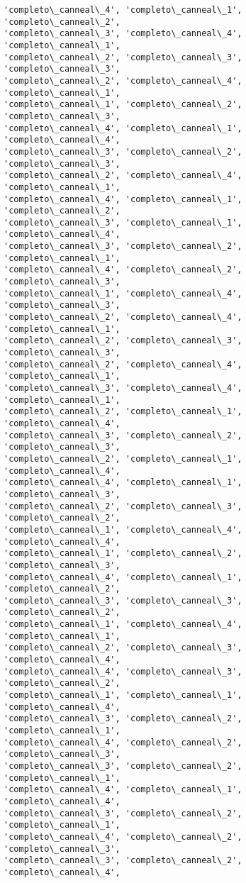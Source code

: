 \documentclass[11pt]{article}
\begin{document}
\begin{Verbatim}[commandchars=\\\{\}]
'completo\_canneal\_4', 'completo\_canneal\_1', 'completo\_canneal\_2',
'completo\_canneal\_3', 'completo\_canneal\_4', 'completo\_canneal\_1',
'completo\_canneal\_2', 'completo\_canneal\_3', 'completo\_canneal\_3',
'completo\_canneal\_2', 'completo\_canneal\_4', 'completo\_canneal\_1',
'completo\_canneal\_1', 'completo\_canneal\_2', 'completo\_canneal\_3',
'completo\_canneal\_4', 'completo\_canneal\_1', 'completo\_canneal\_4',
'completo\_canneal\_3', 'completo\_canneal\_2', 'completo\_canneal\_3',
'completo\_canneal\_2', 'completo\_canneal\_4', 'completo\_canneal\_1',
'completo\_canneal\_4', 'completo\_canneal\_1', 'completo\_canneal\_2',
'completo\_canneal\_3', 'completo\_canneal\_1', 'completo\_canneal\_4',
'completo\_canneal\_3', 'completo\_canneal\_2', 'completo\_canneal\_1',
'completo\_canneal\_4', 'completo\_canneal\_2', 'completo\_canneal\_3',
'completo\_canneal\_1', 'completo\_canneal\_4', 'completo\_canneal\_3',
'completo\_canneal\_2', 'completo\_canneal\_4', 'completo\_canneal\_1',
'completo\_canneal\_2', 'completo\_canneal\_3', 'completo\_canneal\_3',
'completo\_canneal\_2', 'completo\_canneal\_4', 'completo\_canneal\_1',
'completo\_canneal\_3', 'completo\_canneal\_4', 'completo\_canneal\_1',
'completo\_canneal\_2', 'completo\_canneal\_1', 'completo\_canneal\_4',
'completo\_canneal\_3', 'completo\_canneal\_2', 'completo\_canneal\_3',
'completo\_canneal\_2', 'completo\_canneal\_1', 'completo\_canneal\_4',
'completo\_canneal\_4', 'completo\_canneal\_1', 'completo\_canneal\_3',
'completo\_canneal\_2', 'completo\_canneal\_3', 'completo\_canneal\_2',
'completo\_canneal\_1', 'completo\_canneal\_4', 'completo\_canneal\_4',
'completo\_canneal\_1', 'completo\_canneal\_2', 'completo\_canneal\_3',
'completo\_canneal\_4', 'completo\_canneal\_1', 'completo\_canneal\_2',
'completo\_canneal\_3', 'completo\_canneal\_3', 'completo\_canneal\_2',
'completo\_canneal\_1', 'completo\_canneal\_4', 'completo\_canneal\_1',
'completo\_canneal\_2', 'completo\_canneal\_3', 'completo\_canneal\_4',
'completo\_canneal\_4', 'completo\_canneal\_3', 'completo\_canneal\_2',
'completo\_canneal\_1', 'completo\_canneal\_1', 'completo\_canneal\_4',
'completo\_canneal\_3', 'completo\_canneal\_2', 'completo\_canneal\_1',
'completo\_canneal\_4', 'completo\_canneal\_2', 'completo\_canneal\_3',
'completo\_canneal\_3', 'completo\_canneal\_2', 'completo\_canneal\_1',
'completo\_canneal\_4', 'completo\_canneal\_1', 'completo\_canneal\_4',
'completo\_canneal\_3', 'completo\_canneal\_2', 'completo\_canneal\_1',
'completo\_canneal\_4', 'completo\_canneal\_2', 'completo\_canneal\_3',
'completo\_canneal\_3', 'completo\_canneal\_2', 'completo\_canneal\_4',

\end{Verbatim}
\end{document}
